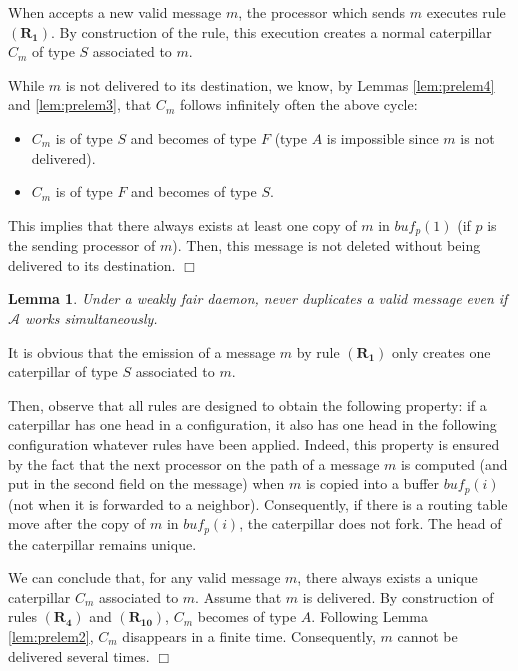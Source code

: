 \documentclass[11pt]{article}
\newtheorem{lemma}{Lemma}
\newenvironment{proof}{{\noindent\bf Proof. } }{{\hfill $\Box$}}
\begin{document}
\begin{proof}
When \AD accepts a new valid message $m$, the processor which sends $m$ executes rule $\boldsymbol{(R_{1})}$. By construction of the rule, this execution creates a normal caterpillar $C_{m}$ of type $S$ associated to $m$.

While $m$ is not delivered to its destination, we know, by Lemmas \ref{lem:prelem4} and \ref{lem:prelem3}, that $C_{m}$ follows infinitely often the above cycle:

\begin{itemize}
\item $C_{m}$ is of type $S$ and becomes of type $F$ (type $A$ is impossible since $m$ is not delivered).
\item $C_{m}$ is of type $F$ and becomes of type $S$.
\end{itemize}

This implies that there always exists at least one copy of $m$ in $buf_{p}(1)$ (if $p$ is the sending processor of $m$). Then, this message is not deleted without being delivered to its destination.
\end{proof}

\begin{lemma} \label{lem:duplicationD}
Under a weakly fair daemon, \AD never duplicates a valid message even if $\mathcal{A}$ works simultaneously.
\end{lemma}

\begin{proof}
It is obvious that the emission of a message $m$ by rule $\boldsymbol{(R_{1})}$ only creates one caterpillar of type $S$ associated to $m$. 

Then, observe that all rules are designed to obtain the following property: if a caterpillar has one head in a configuration, it also has one head in the following configuration whatever rules have been applied. Indeed, this property is ensured by the fact that the next processor on the path of a message $m$ is computed (and put in the second field on the message) when $m$ is copied into a buffer $buf_{p}(i)$ (not when it is forwarded to a neighbor). Consequently, if there is a routing table move after the copy of $m$ in $buf_{p}(i)$, the caterpillar does not fork. The head of the caterpillar remains unique.

We can conclude that, for any valid message $m$, there always exists a unique caterpillar $C_{m}$ associated to $m$. Assume that $m$ is delivered. By construction of rules $\boldsymbol{(R_{4})}$ and $\boldsymbol{(R_{10})}$, $C_{m}$ becomes of type $A$. Following Lemma \ref{lem:prelem2}, $C_{m}$ disappears in a finite time. Consequently, $m$ cannot be delivered several times.
\end{proof}
\end{document}
